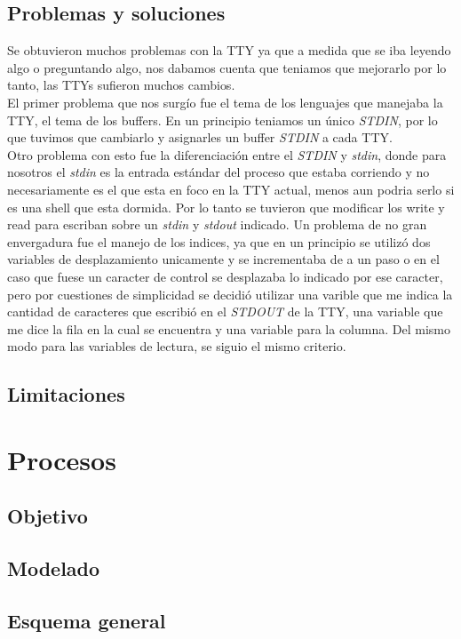 \documentclass[10pt,a4paper]{article}
\begin{document}
	\subsection{Problemas y soluciones}
		Se obtuvieron muchos problemas con la TTY ya que a medida que se iba leyendo algo o preguntando algo, nos dabamos cuenta que teniamos que mejorarlo por lo tanto, las TTYs sufieron muchos cambios.\\
		El primer problema que nos surg\'io fue el tema de los lenguajes que manejaba la TTY, el tema de los buffers. En un principio teniamos un \'unico \textit{STDIN}, por lo que tuvimos que cambiarlo y asignarles un buffer \textit{STDIN} a cada TTY. \\
		Otro problema con esto fue la diferenciaci\'on entre el \textit{STDIN} y \textit{stdin}, donde para nosotros el \textit{stdin} es la entrada est\'andar del proceso que estaba corriendo y no necesariamente es el que esta en foco en la TTY actual, menos aun podria serlo si es una shell que esta dormida. Por lo tanto se tuvieron que modificar los write y read para escriban sobre un \textit{stdin} y \textit{stdout} indicado.
		Un problema de no gran envergadura fue el manejo de los indices, ya que en un principio se utiliz\'o dos variables de desplazamiento unicamente y se incrementaba de a un paso o en el caso que fuese un caracter de control se desplazaba lo indicado por ese caracter, pero por cuestiones de simplicidad se decidi\'o utilizar una varible que me indica la cantidad de caracteres que escribi\'o en el \textit{STDOUT} de la TTY, una variable que me dice la fila en la cual se encuentra y una variable para la columna. Del mismo modo para las variables de lectura, se siguio el mismo criterio.
	\subsection{Limitaciones}
		
\section{Procesos}
	\subsection{Objetivo}
	\subsection{Modelado}
	\subsection{Esquema general}
\end{document}
